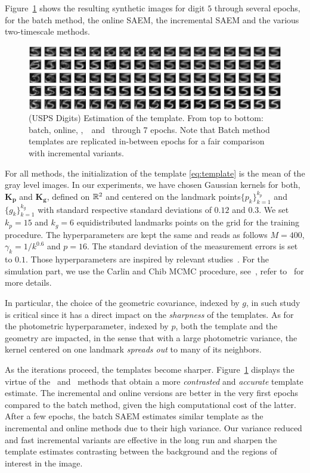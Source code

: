 \documentclass[journal, 11pt]{IEEEtran}
\begin{document}
Figure~\ref{fig:results} shows the resulting synthetic images for digit $5$ through several epochs, for the batch method, the online SAEM, the incremental SAEM and the various two-timescale methods.
\begin{figure}[h]
\includegraphics[width=\textwidth]{fig/deformable3}
\caption{(USPS Digits) Estimation of the template. From top to bottom: batch, online, \ISAEM,\ \SAEMVR\ and \FISAEM\ through 7 epochs. Note that Batch method templates are replicated in-between epochs for a fair comparison with incremental variants. }
\label{fig:results}
\end{figure}
For all methods, the initialization of the template \eqref{eq:template} is the mean of the gray level images.
In our experiments, we have chosen Gaussian kernels for both, $\mathbf{K}_{\mathbf{p}}$ and $\mathbf{K}_{\mathbf{g}}$, defined on $\mathbb{R}^2$ and centered on the landmark points$\{p_k\}_{k=1}^{k_p}$ and $\{g_k\}_{k=1}^{k_g}$ with standard respective standard deviations of $0.12$ and $0.3$. 
We set $k_p = 15$  and  $k_g = 6$ equidistributed landmarks points on the grid for the training procedure. 
The hyperparameters are kept the same and reads as follows $M = 400$, $ \gamma_k = 1/k^{0.6}$ and $ p = 16$.
The standard deviation of the measurement errors is set to $0.1$.
Those hyperparameters are inspired by relevant studies~\cite{allassonniere2008stochastic,allassonniere2010construction}.
For the simulation part, we use the Carlin and Chib MCMC procedure, see~\cite{carlin1995bayesian}, refer to~\cite{maire2016online} for more details.

In particular, the choice of the geometric covariance, indexed by $g$, in such study is critical since it has a direct impact on the \emph{sharpness} of the templates.
As for the photometric hyperparameter, indexed by $p$, both the template and the geometry are impacted, in the sense that with a large photometric variance, the kernel centered on one landmark \emph{spreads out} to many of its neighbors.


As the iterations proceed, the templates become sharper.
Figure~\ref{fig:results} displays the virtue of the \SAEMVR\ and \FISAEM\ methods that obtain a more \textit{contrasted} and \textit{accurate} template estimate. 
The incremental and online versions are better in the very first epochs compared to the batch method, given the high computational cost of the latter. 
After a few epochs, the batch SAEM estimates similar template as the incremental and online methods due to their high variance. 
Our variance reduced and fast incremental variants are effective in the long run and sharpen the template estimates contrasting between the background and the regions of interest in the image.
\end{document}

